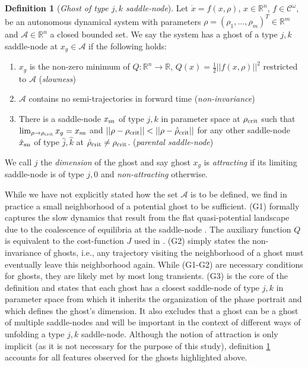 \documentclass{article}
\theoremstyle{definition}
\newtheorem{definition}{Definition}[section]
\begin{document}
\begin{refsection}
\begin{definition}[\textit{Ghost of type $j,k$ saddle-node}]\label{def:ghost}
Let $\dot{x} = f(x,\rho)$, $x\in \mathbb{R}^n$, $f\in \mathcal{C}^\omega$, be an autonomous dynamical system with parameters $\rho = (\rho_1,\dots,\rho_m)^T\in \mathbb{R}^m$ and $\mathcal{A}\in\mathbb{R}^n$ a closed bounded set. We say the system has a ghost of a type $j,k$ saddle-node at $x_g\in \mathcal{A}$ if the following holds:
\begin{enumerate}[label={(\textbf{G\arabic*})}, ref={(\textbf{G\arabic*})}]
    \item $x_g$ is the non-zero minimum of $Q:\mathbb{R}^n\to \mathbb{R}$, $Q(x)=\frac{1}{2}||f(x,\rho)||^2$ restricted to $\mathcal{A}$ (\textit{slowness})
    \item $\mathcal{A}$ contains no semi-trajectories in forward time (\textit{non-invariance})
    \item There is a saddle-node $x_{\textnormal{sn}}$%
    of type $j,k$ in parameter space at $\rho_{\textnormal{crit}}$ such that $\lim_{\rho\to\rho_{\textnormal{crit}}}x_g=x_{\textnormal{sn}}$ and \mbox{$||\rho-\rho_{\textnormal{crit}}||<||\rho-\hat\rho_{\textnormal{crit}}||$} for any other saddle-node $\hat{x}_{\textnormal{sn}}$ of type $\hat{j},\hat{k}$ at $\hat{\rho}_{\textnormal{crit}}\neq \rho_{\textnormal{crit}}$.  (\textit{parental saddle-node})
\end{enumerate}
We call $j$ the \emph{dimension} of the ghost and say ghost $x_g$ is \emph{attracting} if its limiting saddle-node is of type $j,0$ and \emph{non-attracting} otherwise.
\end{definition}

While we have not explicitly stated how the set $\mathcal{A}$ is to be defined, we find in practice a small neighborhood of a potential ghost to be sufficient. (G1) formally captures the slow dynamics that result from the flat quasi-potential landscape due to the coalescence of equilibria at the saddle-node \cite{Stanoev2018,Koch_2024,Koch2024_rev}. The auxiliary function $Q$ is equivalent to the cost-function $J$ used in \cite{Zheng2025}. (G2) simply states the non-invariance of ghosts, i.e., any trajectory visiting the neighborhood of a ghost must eventually leave this neighborhood again. While (G1-G2) are necessary conditions for ghosts, they are likely met by most long transients. (G3) is the core of the definition and states that each ghost has a closest saddle-node of type $j,k$ in parameter space from which it inherits the organization of the phase portrait and which defines the ghost's dimension. 
It also excludes that a ghost can be a ghost of multiple saddle-nodes and will be important in the context of different ways of unfolding a type $j,k$ saddle-node. Although the notion of attraction is only implicit (as it is not necessary for the purpose of this study), definition \ref{def:ghost} accounts for all features observed for the ghosts highlighted above. 



\end{refsection}
\end{document}
